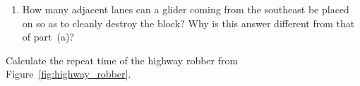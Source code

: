 \begin{multicols}{2}
\begin{problem}
\begin{enumerate}[label=\bf\color{ocre}(\alph*)]
			\item How many adjacent lanes can a glider coming from the southeast be placed on so as to cleanly destroy the block? Why is this answer different from that of part~(a)?
		\end{enumerate}
	\end{problem}
	
	
	\mfilbreak
	
	
	\begin{problem}\label{exer:highway_robber_repeat}
		Calculate the repeat time of the highway robber from Figure~\ref{fig:highway_robber}.
	\end{problem}
	
	
	
	
\end{multicols}
\normalsize\vspace*{0.01cm}
